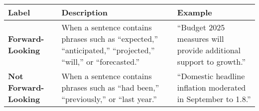 \begin{table*}
    \caption{}
    \vspace{1em}
    \begin{tabular}{p{} p{} p{}}
    \toprule
    \textbf{Label} & \textbf{Description} & \textbf{Example} \\
    \midrule
    \textbf{Forward-Looking} & When a sentence contains phrases such as “expected,” “anticipated,” “projected,” “will,” or “forecasted.”  & “Budget 2025 measures will provide additional support to growth.” \\
    \midrule
    \textbf{Not Forward-Looking} & When a sentence contains phrases such as “had been,” “previously,” or “last year.”  & “Domestic headline inflation moderated in September to 1.8.” \\
    \bottomrule
    \end{tabular}
    \label{tb:bnm_forward_looking_guide}
\end{table*}
    